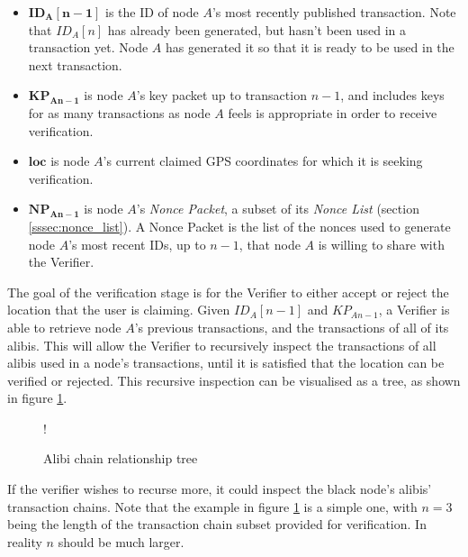\begin{itemize}[noitemsep,topsep=0pt]
	\item[] $\mathbf{ID_{A}[n-1]}$ is the ID of node $A$'s most recently published transaction. Note that $ID_A[n]$ has already been generated, but hasn't been used in a transaction yet. Node $A$ has generated it so that it is ready to be used in the next transaction.
	\item[] $\mathbf{KP_{An-1}}$ is node $A$'s key packet up to transaction $n-1$, and includes keys for as many transactions as node $A$ feels is appropriate in order to receive verification.
	\item[] $\mathbf{loc}$ is node $A$'s current claimed GPS coordinates for which it is seeking verification.
	\item[] $\mathbf{NP_{An-1}}$ is node $A$'s \textit{Nonce Packet}, a subset of its \textit{Nonce List} (section \ref{sssec:nonce_list}). A Nonce Packet is the list of the nonces used to generate node $A$'s most recent IDs, up to $n-1$, that node $A$ is willing to share with the Verifier. 
\end{itemize}

\null
The goal of the verification stage is for the Verifier to either accept or reject the location that the user is claiming. Given $ID_{A}[n-1]$ and $KP_{An-1}$, a Verifier is able to retrieve node $A$'s previous transactions, and the transactions of all of its alibis. This will allow the Verifier to recursively inspect the transactions of all alibis used in a node's transactions, until it is satisfied that the location can be verified or rejected. This recursive inspection can be visualised as a tree, as shown in figure \ref{fig:tree}.

\begin{figure}[H]
\begin{center}
 {!} {}
\vspace{-3cm}
\caption{Alibi chain relationship tree}
\label{fig:tree}
\end{center}
\end{figure}

If the verifier wishes to recurse more, it could inspect the black node's alibis' transaction chains. Note that the example in figure \ref{fig:tree} is a simple one, with $n = 3$ being the length of the transaction chain subset provided for verification. In reality $n$ should be much larger.

